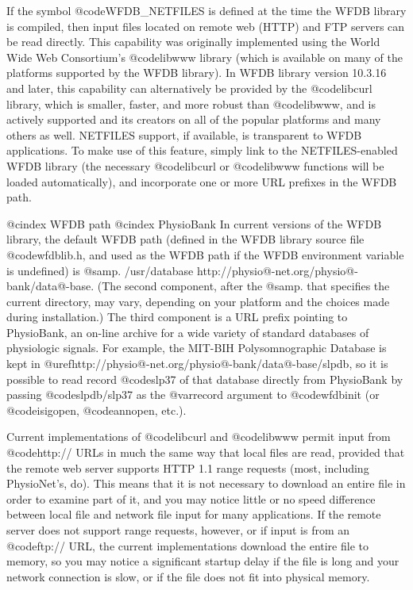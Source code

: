 {{{{{{{{{If the symbol @code{WFDB_NETFILES} is defined at the time the WFDB library is
compiled, then input files located on remote web (HTTP) and FTP servers can be
read directly.  This capability was originally implemented using the World Wide
Web Consortium's @code{libwww} library (which is available on many of the
platforms supported by the WFDB library).  In WFDB library version 10.3.16 and
later, this capability can alternatively be provided by the @code{libcurl}
library, which is smaller, faster, and more robust than @code{libwww}, and is
actively supported and its creators on all of the popular platforms and many
others as well.  NETFILES support, if available, is transparent to WFDB
applications.  To make use of this feature, simply link to the NETFILES-enabled
WFDB library (the necessary @code{libcurl} or @code{libwww} functions will be
loaded automatically), and incorporate one or more URL prefixes in the WFDB
path.

@cindex WFDB path
@cindex PhysioBank
In current versions of the WFDB library, the default WFDB path (defined in the
WFDB library source file @code{wfdblib.h}, and used as the WFDB path if the
WFDB environment variable is undefined) is @samp{. /usr/database
http://physio@-net.org/physio@-bank/data@-base}.  (The second component,
after the @samp{.} that specifies the current directory, may vary, depending on
your platform and the choices made during installation.)  The third component
is a URL prefix pointing to PhysioBank, an on-line archive for a wide variety
of standard databases of physiologic signals.
For example, the MIT-BIH Polysomnographic Database is kept in
@uref{http://physio@-net.org/physio@-bank/data@-base/slpdb}, so it is
possible to read record @code{slp37} of that database directly from PhysioBank
by passing @code{slpdb/slp37} as the @var{record} argument to @code{wfdbinit}
(or @code{isigopen}, @code{annopen}, etc.).

Current implementations of @code{libcurl} and @code{libwww} permit input from
@code{http://} URLs in much the same way that local files are read, provided
that the remote web server supports HTTP 1.1 range requests (most, including
PhysioNet's, do).  This means that it is not necessary to download an entire
file in order to examine part of it, and you may notice little or no speed
difference between local file and network file input for many applications.  If
the remote server does not support range requests, however, or if input is from
an @code{ftp://} URL, the current implementations download the entire file to
memory, so you may notice a significant startup delay if the file is long and
your network connection is slow, or if the file does not fit into physical
memory.

}}}}}}}}}
